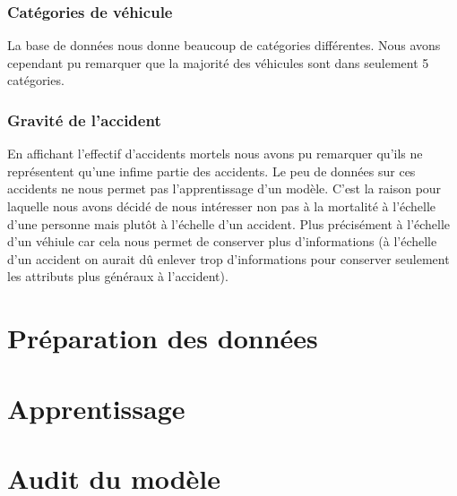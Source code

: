 \documentclass[]{article}
\begin{document}
    \subsubsection{Catégories de véhicule}
    La base de données nous donne beaucoup de catégories différentes. Nous avons cependant pu remarquer 
    que la majorité des véhicules sont dans seulement 5 catégories.

    \subsubsection{Gravité de l'accident}
    En affichant l'effectif d'accidents mortels nous avons pu remarquer qu'ils ne représentent qu'une 
    infime partie des accidents. Le peu de données sur ces accidents ne nous permet pas l'apprentissage 
    d'un modèle. C'est la raison pour laquelle nous avons décidé de nous intéresser non pas à la mortalité 
    à l'échelle d'une personne mais plutôt à l'échelle d'un accident. Plus précisément à l'échelle d'un 
    véhiule car cela nous permet de conserver plus d'informations (à l'échelle d'un accident on aurait 
    dû enlever trop d'informations pour conserver seulement les attributs plus généraux à l'accident).

    \section{Préparation des données}

    \section{Apprentissage}

    \section{Audit du modèle}
\end{document}
